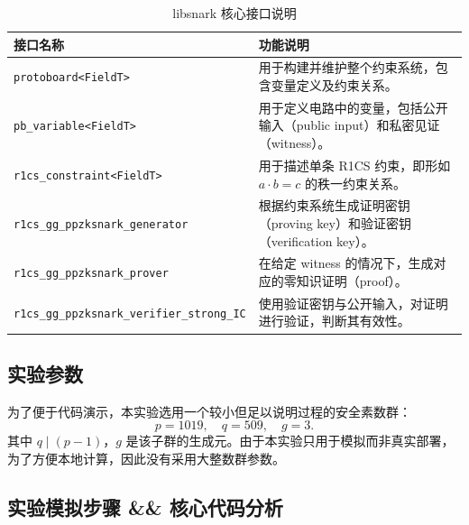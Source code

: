\documentclass[a4paper]{article}
\begin{document}
{
\renewcommand{\arraystretch}{1.3} %

\begin{table}[h]
\centering
\small
\caption{libsnark 核心接口说明}
\label{tab:libsnark_api}


\begin{tabular}{>{\raggedright\arraybackslash}p{5.2cm} >{\raggedright\arraybackslash}p{8.5cm}}
\toprule
\rowcolor{gray!25}
\textbf{接口名称} & \textbf{功能说明} \\
\midrule

\texttt{protoboard<FieldT>} & 用于构建并维护整个约束系统，包含变量定义及约束关系。 \\

\texttt{pb\_variable<FieldT>} & 用于定义电路中的变量，包括公开输入（public input）和私密见证（witness）。 \\

\texttt{r1cs\_constraint<FieldT>} & 用于描述单条 R1CS 约束，即形如 $a \cdot b = c$ 的秩一约束关系。 \\

\texttt{r1cs\_gg\_ppzksnark\_generator} & 根据约束系统生成证明密钥（proving key）和验证密钥（verification key）。 \\

\texttt{r1cs\_gg\_ppzksnark\_prover} & 在给定 witness 的情况下，生成对应的零知识证明（proof）。 \\

\texttt{r1cs\_gg\_ppzksnark\_verifier\_strong\_IC} & 使用验证密钥与公开输入，对证明进行验证，判断其有效性。 \\

\bottomrule
\end{tabular}
\end{table}

}

\subsection{实验参数}
为了便于代码演示，本实验选用一个较小但足以说明过程的安全素数群：
\[
p=1019,\quad q=509,\quad g=3.
\]
其中 $q \mid (p-1)$，$g$ 是该子群的生成元。由于本实验只用于模拟而非真实部署，为了方便本地计算，因此没有采用大整数群参数。


\subsection{实验模拟步骤 \&\& 核心代码分析}
\end{document}
